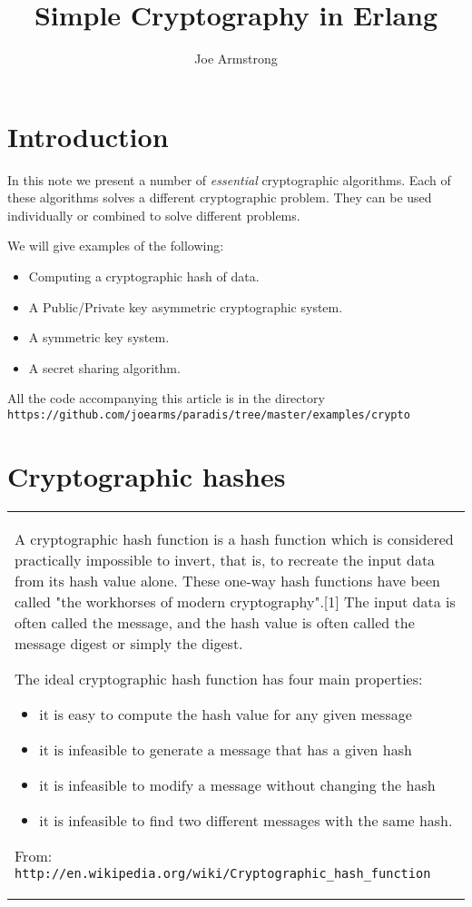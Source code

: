 \documentclass[12pt]{article}
\title{Simple Cryptography in Erlang}
\author{Joe Armstrong}
\begin{document}
\maketitle

\tableofcontents

\section{Introduction}

In this note we present a number of {\sl essential} cryptographic algorithms.
Each of these algorithms solves a different cryptographic problem.
They can be used individually or combined to solve different problems.

We will give examples of the following:

\begin{itemize}
\item Computing a cryptographic hash of data.
\item A Public/Private key asymmetric cryptographic system.
\item A symmetric key system.
\item A secret sharing algorithm.
\end{itemize}

All the code accompanying this article is in the directory\\
\verb+https://github.com/joearms/paradis/tree/master/examples/crypto+

\section{Cryptographic hashes}



\begin{tabular}{|p{10cm}}
A cryptographic hash function is a hash function which is considered
practically impossible to invert, that is, to recreate the input data
from its hash value alone. These one-way hash functions have been
called "the workhorses of modern cryptography".[1] The input data is
often called the message, and the hash value is often called the
message digest or simply the digest.

The ideal cryptographic hash function has four main properties:


\begin{itemize}
  \item it is easy to compute the hash value for any given message
  \item it is infeasible to generate a message that has a given hash
  \item it is infeasible to modify a message without changing the hash
  \item it is infeasible to find two different messages with the same hash.
\end{itemize}

From: \verb+http://en.wikipedia.org/wiki/Cryptographic_hash_function+

\end{tabular}
\end{document}
